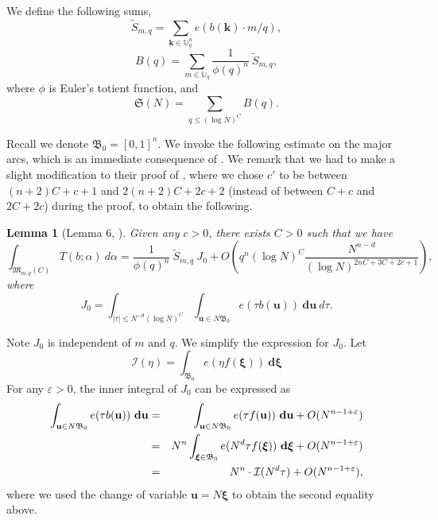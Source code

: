 \documentclass[12pt]{amsart}
\newtheorem{lem}[thm]{Lemma}
\theoremstyle{definition}
\theoremstyle{remark}
\numberwithin{equation}{section}
\begin{document}
We define the following sums,
\begin{equation}
\label{defn Stilde}
\widetilde{S}_{{m}, q } = \sum_{\mathbf{k} \in \mathbb{U}_q^n} e( {b}(\mathbf{k}) \cdot {m}/q ),
\end{equation}
$$
B( q ) = \sum_{{m} \in \mathbb{U}_q} \frac{1}{\phi(q)^n} \ \widetilde{S}_{ {m}, q }, 
$$
where $\phi$ is Euler's totient function,
and
$$
\mathfrak{S}( N) = \sum_{q \leq (\log N)^C}  B( q ).
$$

Recall we denote $\mathfrak{B}_0 = [0,1]^n$.
We invoke the following estimate on the major arcs, which is an immediate consequence of \cite[Lemma 6]{CM}.
We remark that we had to make a slight modification to their proof of \cite[Lemma 6]{CM}, where we chose $c'$ to be between $(n+2)C + c + 1$ and $2(n+2)C + 2c + 2$ 
(instead of between $C + c$ and $2C + 2c$) during the proof, to obtain the following.

\begin{lem}[Lemma 6, \cite{CM}]
\label{Lemma 6 in CM} Given any $c>0$, there exists $C>0$ such that we have
$$
\int_{\mathfrak{M}_{{m}, q}(C)} T({b}; {\alpha} ) \ {d}{\alpha}
=
\frac{1}{\phi(q)^n} \ \widetilde{S}_{{m}, q } \  J_0 + O\left( q^n (\log N)^C \frac{N^{n - d}}{(\log N)^{2nC + 3C +2 c + 1}} \right),
$$
where
$$
J_0 = \int_{|\tau| \leq N^{-d} (\log N)^C } \int_{\mathbf{u} \in N \mathfrak{B}_0 } e( \tau b(\mathbf{u}) ) \ \mathbf{d} \mathbf{u} \ d \tau.
$$
\end{lem}
Note $J_0$ is independent of ${m}$ and  $q$.
We simplify the expression for $J_0$.
Let
$$
\mathcal{I}( {\eta}) = \int_{ \mathfrak{B}_0 } e( \eta f( \boldsymbol{\xi}) ) \ \mathbf{d} \boldsymbol{\xi}
$$
For any $\varepsilon > 0$, the inner integral of $J_0$ can be expressed as
\begin{eqnarray}
\int_{\mathbf{u} \in N \mathfrak{B}_0 } e( \tau b(\mathbf{u})  ) \ \mathbf{d} \mathbf{u}
&=& \int_{\mathbf{u} \in N \mathfrak{B}_0 } e( \tau f(\mathbf{u}) ) \ \mathbf{d} \mathbf{u} + O(N^{n - 1 + \varepsilon})
\notag
\\
&=& N^n \int_{\boldsymbol{\xi} \in \mathfrak{B}_0 } e( N^d \tau f(\boldsymbol{\xi})   ) \ \mathbf{d} \boldsymbol{\xi} + O(N^{n - 1 + \varepsilon})
\notag
\\
&=& N^n \cdot \mathcal{I}( N^d \tau ) + O(N^{n - 1 + \varepsilon}),
\notag
\end{eqnarray}
where we used the change of variable $\mathbf{u} =  N \boldsymbol{\xi}$ to obtain the second equality above.
\end{document}
